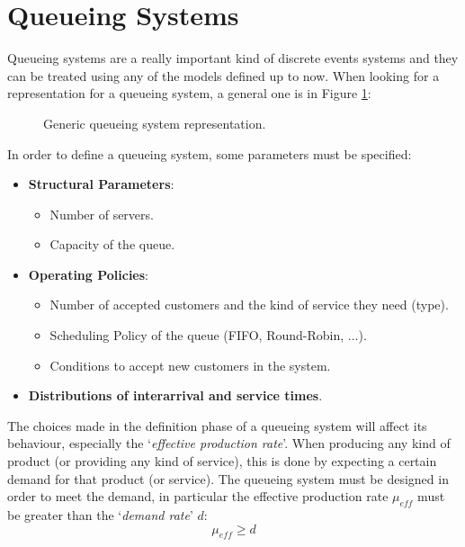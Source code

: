 \documentclass[12pt,a4paper]{article}
\begin{document}
\section{Queueing Systems}
\label{sec:QS}
Queueing systems are a really important kind of discrete events systems and they can be treated using any of the models defined up to now. When looking for a representation for a queueing system, a general one is in Figure \ref{fig:QueueingSys}:
\begin{figure}[H]
\centering
{}
\caption{Generic queueing system representation.}
\label{fig:QueueingSys}
\end{figure}
In order to define a queueing system, some parameters must be specified:
\begin{itemize}
\item \textbf{Structural Parameters}:
	\begin{itemize}
	\item Number of servers.
	\item Capacity of the queue.
	\end{itemize}
\item \textbf{Operating Policies}:
	\begin{itemize}
	\item Number of accepted customers and the kind of service they need (type).
	\item Scheduling Policy of the queue (FIFO, Round-Robin, ...).
	\item Conditions to accept new customers in the system.
	\end{itemize}
\item \textbf{Distributions of interarrival and service times}.
\end{itemize}
The choices made in the definition phase of a queueing system will affect its behaviour, especially the 
`\textit{effective production rate}'. When producing any kind of product (or providing any kind of service), this is done by expecting a certain demand for that product (or service). The queueing system must be designed in order to meet the demand, in particular the effective production rate $\mu_{eff}$ must be greater than the `\textit{demand rate}' $d$:
$$
\mu_{eff}\geq d
$$
\newpage
\end{document}
